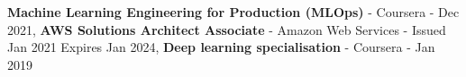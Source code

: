 \documentclass[9pt]{developercv} %
\begin{document}
\vspace{-10 pt}
    \vspace{-6pt}
    
    \hspace{26mm} \textbf{Machine Learning Engineering for Production (MLOps)} - Coursera - Dec 2021, \textbf{AWS Solutions Architect Associate} - Amazon Web Services - Issued Jan 2021 Expires Jan 2024, \textbf{Deep learning specialisation} - Coursera - Jan 2019

\end{document}
